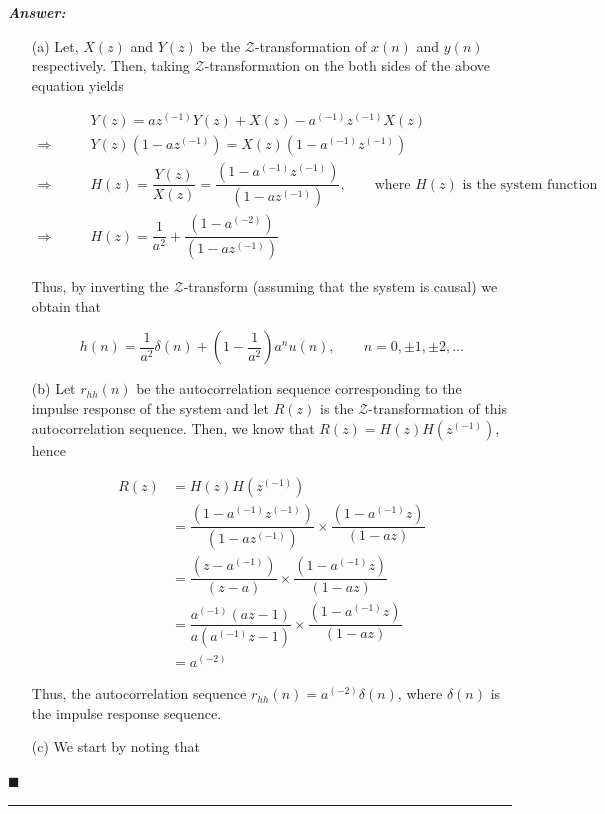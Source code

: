 \documentclass[12pt]{article}
\theoremstyle{definition}
\newenvironment{answer}{
    \textbf{\textit{Answer:}} \qquad
}{\hfill $\blacksquare$ \\ 

\begin{center}
    \rule{0.8\linewidth}{1.5px} 
    \vspace*{1cm}   
\end{center}
}
\newcommand{\zcal}{\mathcal{Z}}
\newcommand{\inv}[1][1]{^{(- #1)}}
\begin{document}
\begin{answer}
    \begin{enumerate}
        \item[(a)] Let, $X(z)$ and $Y(z)$ be the $\zcal$-transformation of $x(n)$ and $y(n)$ respectively. Then, taking $\zcal$-transformation on the both sides of the above equation yields
        
        \begin{align*}
            & Y(z) = az\inv Y(z) + X(z) - a\inv z\inv X(z)\\
            \Rightarrow \qquad & Y(z) (1 - az\inv) = X(z) (1 - a\inv z\inv)\\
            \Rightarrow \qquad & H(z) = \dfrac{Y(z)}{X(z)} = \dfrac{(1 - a\inv z\inv)}{(1 - az\inv)}, \qquad \text{where } H(z) \text{ is the system function}\\
            \Rightarrow \qquad & H(z) = \dfrac{1}{a^2} + \dfrac{(1 - a\inv[2])}{(1 - az\inv)} 
        \end{align*}

        Thus, by inverting the $\zcal$-transform (assuming that the system is causal) we obtain that 

        $$
        h(n) = \dfrac{1}{a^2} \delta(n) + \left(1 - \dfrac{1}{a^2} \right) a^n u(n), \qquad n = 0, \pm 1, \pm 2, \dots
        $$

        \item[(b)] Let $r_{hh}(n)$ be the autocorrelation sequence corresponding to the impulse response of the system and let $R(z)$ is the $\zcal$-transformation of this autocorrelation sequence. Then, we know that $R(z) = H(z)H(z\inv)$, hence 
        
        \begin{align*}
            R(z) 
            & = H(z)H(z\inv)\\
            & = \dfrac{(1 - a\inv z\inv)}{(1 - az\inv)} \times \dfrac{(1 - a\inv z)}{(1 - a z)}\\
            & = \dfrac{(z - a\inv)}{(z - a)} \times \dfrac{(1 - a\inv z)}{(1 - a z)}\\
            & = \dfrac{a\inv (az - 1)}{a(a\inv z - 1)} \times \dfrac{(1 - a\inv z)}{(1 - a z)}\\
            & = a\inv[2]       
        \end{align*}

        Thus, the autocorrelation sequence $r_{hh}(n) = a\inv[2] \delta(n)$, where $\delta(n)$ is the impulse response sequence.

        \item[(c)] We start by noting that
        

\end{enumerate}
\end{answer}
\end{document}
